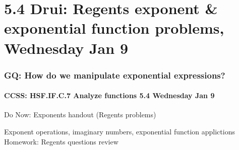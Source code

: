 \documentclass{beamer}
\begin{document}
  \section{5.4 Drui: Regents exponent \& exponential function problems, Wednesday Jan 9}
    \frame
    {
      \frametitle{GQ: How do we manipulate exponential expressions?}
      \framesubtitle{CCSS: HSF.IF.C.7 Analyze functions    \alert{5.4 Wednesday Jan 9}}

      \begin{block}{Do Now: Exponents handout (Regents problems)}
      \end{block}
      Exponent operations, imaginary numbers, exponential function applictions \\ \bigskip
      Homework: Regents questions review
    }
\end{document}
